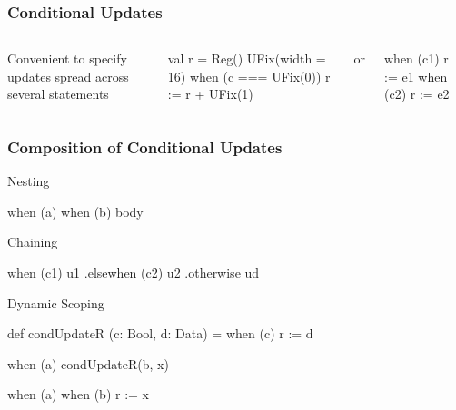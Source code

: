 \documentclass[xcolor=pdflatex,dvipsnames,table]{beamer}
\begin{document}
\begin{frame}[fragile]
\frametitle{Conditional Updates}

\begin{columns}


Convenient to specify updates spread across several statements
\begin{scala}
val r = Reg() { UFix(width = 16) } 
when (c === UFix(0)) {
  r := r + UFix(1)
}
\end{scala}
or
{\lstset{frame=shadowbox}
\begin{scala}
when (c1) { r := e1 } 
when (c2) { r := e2 }
\end{scala}
}



\end{columns}
\end{frame}

\begin{frame}[fragile]
\frametitle{Composition of Conditional Updates}

Nesting
\begin{scala}
when (a) { when (b) { body } }
\end{scala}
Chaining
\begin{scala}
when (c1) { u1 }
.elsewhen (c2) { u2 }
.otherwise { ud }
\end{scala}
Dynamic Scoping
\begin{scala}
def condUpdateR (c: Bool, d: Data) = when (c) { r := d }
\end{scala}
\begin{scala}
when (a) { condUpdateR(b, x) }
\end{scala}
\begin{scala}
when (a) { when (b) { r := x } }
\end{scala}

\end{frame}
\end{document}

